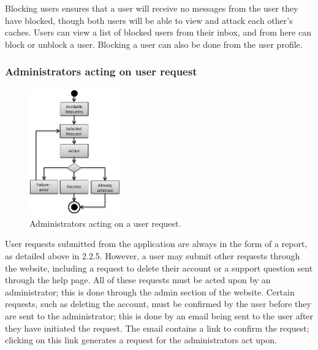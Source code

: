 Blocking users ensures that a user will receive no messages from the user they have blocked, though both users will be able to view and attack each other’s caches. Users can view a list of blocked users from their inbox, and from here can block or unblock a user. Blocking a user can  also be done from the user profile.

\subsubsection{Administrators acting on user request}

\begin{figure}
	\vspace{-20pt}
	\begin{center}
	\includegraphics[width=0.35\textwidth]{images/admins_acting}
	\caption{Administrators acting on a user request.}
	\label{admins_acting}
	\end{center}
	\vspace{-20pt}
\end{figure}

User requests submitted from the application are always in the form of a report, as detailed above in 2.2.5. However, a user may submit other requests through the website, including a request to delete their account or a support question sent through the help page. All of these requests must be acted upon by an administrator; this is done through the admin section of the website. Certain requests, such as deleting the account, must be confirmed by the user before they are sent to the administrator; this is done by an email being sent to the user after they have initiated the request. The email contains a link to confirm the request; clicking on this link generates a request for the administrators act upon.

